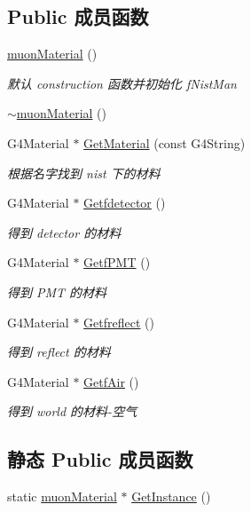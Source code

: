 \subsection*{Public 成员函数}
\begin{DoxyCompactItemize}
\item 
\hyperlink{classmuonMaterial_ae18416f718e33ca4a8bf12b11fe7d4cf}{muon\+Material} ()
\begin{DoxyCompactList}\small\item\em 默认 construction 函数并初始化 f\+Nist\+Man \end{DoxyCompactList}\item 
\hyperlink{classmuonMaterial_a4f043be3ac0578d37c1c2cd801b9a1d8}{$\sim$muon\+Material} ()
\item 
G4\+Material $\ast$ \hyperlink{classmuonMaterial_a86cd49b45dd1042b6ec7aa697197c0b5}{Get\+Material} (const G4\+String)
\begin{DoxyCompactList}\small\item\em 根据名字找到 nist 下的材料 \end{DoxyCompactList}\item 
G4\+Material $\ast$ \hyperlink{classmuonMaterial_a8621980c58fd47d46f47728850341aa5}{Getfdetector} ()
\begin{DoxyCompactList}\small\item\em 得到 detector 的材料 \end{DoxyCompactList}\item 
G4\+Material $\ast$ \hyperlink{classmuonMaterial_a198ba1027e11cf15bc0118533fff4356}{Getf\+P\+MT} ()
\begin{DoxyCompactList}\small\item\em 得到 P\+MT 的材料 \end{DoxyCompactList}\item 
G4\+Material $\ast$ \hyperlink{classmuonMaterial_a8b1a5528153587650e3990045cae47a1}{Getfreflect} ()
\begin{DoxyCompactList}\small\item\em 得到 reflect 的材料 \end{DoxyCompactList}\item 
G4\+Material $\ast$ \hyperlink{classmuonMaterial_a561de210ea339679872c522163990899}{Getf\+Air} ()
\begin{DoxyCompactList}\small\item\em 得到 world 的材料-\/空气 \end{DoxyCompactList}\end{DoxyCompactItemize}
\subsection*{静态 Public 成员函数}
\begin{DoxyCompactItemize}
\item 
static \hyperlink{classmuonMaterial}{muon\+Material} $\ast$ \hyperlink{classmuonMaterial_ac5be4443f4de88103fea67e651cc554b}{Get\+Instance} ()
\end{DoxyCompactItemize}
